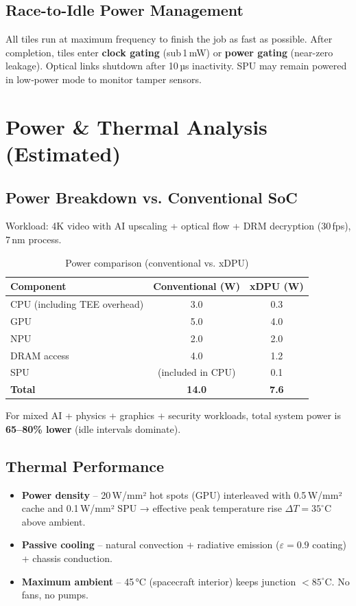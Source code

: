 \documentclass[10pt,twocolumn]{article}
\begin{document}
\subsection{Race-to-Idle Power Management}
All tiles run at maximum frequency to finish the job as fast as possible. After completion, tiles enter \textbf{clock gating} (sub 1 mW) or \textbf{power gating} (near-zero leakage). Optical links shutdown after 10 µs inactivity. SPU may remain powered in low‑power mode to monitor tamper sensors.

\section{Power \& Thermal Analysis (Estimated)}

\subsection{Power Breakdown vs. Conventional SoC}
Workload: 4K video with AI upscaling + optical flow + DRM decryption (30 fps), 7 nm process.

\begin{table}[ht]
\centering
\caption{Power comparison (conventional vs. xDPU)}
\label{tab:power}
\begin{tabular}{@{}lcc@{}}
\toprule
\textbf{Component} & \textbf{Conventional (W)} & \textbf{xDPU (W)} \\
\midrule
CPU (including TEE overhead) & 3.0 & 0.3 \\
GPU & 5.0 & 4.0 \\
NPU & 2.0 & 2.0 \\
DRAM access & 4.0 & 1.2 \\
SPU & (included in CPU) & 0.1 \\
\midrule
\textbf{Total} & \textbf{14.0} & \textbf{7.6} \\
\bottomrule
\end{tabular}
\end{table}

For mixed AI + physics + graphics + security workloads, total system power is \textbf{65–80\% lower} (idle intervals dominate).

\subsection{Thermal Performance}
\begin{itemize}
\item \textbf{Power density} – 20 W/mm² hot spots (GPU) interleaved with 0.5 W/mm² cache and 0.1 W/mm² SPU → effective peak temperature rise \(\Delta T = 35^\circ\)C above ambient.
\item \textbf{Passive cooling} – natural convection + radiative emission (\(\varepsilon=0.9\) coating) + chassis conduction.
\item \textbf{Maximum ambient} – 45 °C (spacecraft interior) keeps junction \(<85^\circ\)C. No fans, no pumps.
\end{itemize}
\end{document}
